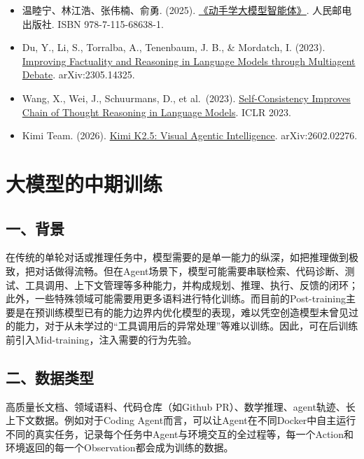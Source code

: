 \vspace{0.25em}
\begin{itemize}
\tightlist
\item
  温睦宁、林江浩、张伟楠、俞勇. (2025). \href{https://haa.boyuai.com/}{《动手学大模型智能体》}. 人民邮电出版社. ISBN 978-7-115-68638-1.
\item
  Du, Y., Li, S., Torralba, A., Tenenbaum, J. B., \& Mordatch, I. (2023). \href{https://arxiv.org/abs/2305.14325}{Improving Factuality and Reasoning in Language Models through Multiagent Debate}. arXiv:2305.14325.
\item
  Wang, X., Wei, J., Schuurmans, D., et al.~(2023). \href{https://openreview.net/forum?id=1PL1NIMMrw}{Self-Consistency Improves Chain of Thought Reasoning in Language Models}. ICLR 2023.
\item
  Kimi Team. (2026). \href{https://arxiv.org/abs/2602.02276}{Kimi K2.5: Visual Agentic Intelligence}. arXiv:2602.02276.
\end{itemize}

\clearpage

\hypertarget{ux5927ux6a21ux578bux7684ux4e2dux671fux8badux7ec3}{%
\section{大模型的中期训练}\label{ux5927ux6a21ux578bux7684ux4e2dux671fux8badux7ec3}}

\hypertarget{ux4e00ux80ccux666f}{%
\subsection{一、背景}\label{ux4e00ux80ccux666f}}

在传统的单轮对话或推理任务中，模型需要的是单一能力的纵深，如把推理做到极致，把对话做得流畅。但在Agent场景下，模型可能需要串联检索、代码诊断、测试、工具调用、上下文管理等多种能力，并构成规划、推理、执行、反馈的闭环；此外，一些特殊领域可能需要用更多语料进行特化训练。而目前的Post-training主要是在预训练模型已有的能力边界内优化模型的表现，难以凭空创造模型未曾见过的能力，对于从未学过的``工具调用后的异常处理''等难以训练。因此，可在后训练前引入Mid-training，注入需要的行为先验。

\hypertarget{ux4e8cux6570ux636eux7c7bux578b}{%
\subsection{二、数据类型}\label{ux4e8cux6570ux636eux7c7bux578b}}

高质量长文档、领域语料、代码仓库（如Github PR）、数学推理、agent轨迹、长上下文数据。例如对于Coding Agent而言，可以让Agent在不同Docker中自主运行不同的真实任务，记录每个任务中Agent与环境交互的全过程等，每一个Action和环境返回的每一个Observation都会成为训练的数据。

